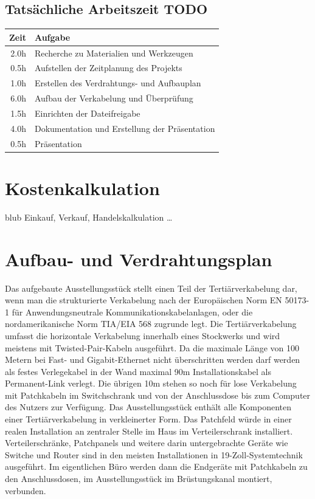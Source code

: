 \documentclass[
a4paper,     %
 headsepline, %
11pt         %
]{scrartcl}  %
\begin{document}
\subsection{Tatsächliche Arbeitszeit TODO}
\begin{tabular}{ r | l }
	\hline 
	Zeit &	Aufgabe \\ \hline
	2.0h &	Recherche zu Materialien und Werkzeugen \\
	0.5h &	Aufstellen der Zeitplanung des Projekts \\
	1.0h &	Erstellen des Verdrahtungs- und Aufbauplan \\
	6.0h &	Aufbau der Verkabelung und Überprüfung \\
	1.5h &	Einrichten der Dateifreigabe \\
	4.0h &	Dokumentation und Erstellung der Präsentation \\
	0.5h & 	Präsentation \\
	\hline
\end{tabular}

\section{Kostenkalkulation}
blub Einkauf, Verkauf, Handelskalkulation …

\section{Aufbau- und Verdrahtungsplan}
Das aufgebaute Ausstellungsstück stellt einen Teil der Tertiärverkabelung dar, wenn man die strukturierte Verkabelung nach der Europäischen Norm EN 50173-1 für Anwendungsneutrale Kommunikationskabelanlagen, oder die nordamerikanische Norm TIA/EIA 568 zugrunde legt.
Die Tertiärverkabelung umfasst die horizontale Verkabelung innerhalb eines Stockwerks und wird meistens mit Twisted-Pair-Kabeln ausgeführt.
Da die maximale Länge von 100 Metern bei Fast- und Gigabit-Ethernet nicht überschritten werden darf werden als festes Verlegekabel in der Wand maximal 90m Installationskabel als Permanent-Link verlegt. 
Die übrigen 10m stehen so noch für lose Verkabelung mit Patchkabeln im Switchschrank und von der Anschlussdose bis zum Computer des Nutzers zur Verfügung.
Das Ausstellungsstück enthält alle Komponenten einer Tertiärverkabelung in verkleinerter Form.
Das Patchfeld würde in einer realen Installation an zentraler Stelle im Haus im Verteilerschrank installiert. 
Verteilerschränke, Patchpanels und weitere darin untergebrachte Geräte wie Switche und Router sind in den meisten Installationen in 19-Zoll-Systemtechnik ausgeführt.
Im eigentlichen Büro werden dann die Endgeräte mit Patchkabeln zu den Anschlussdosen, im Ausstellungsstück im Brüstungskanal montiert, verbunden. 
\end{document}
